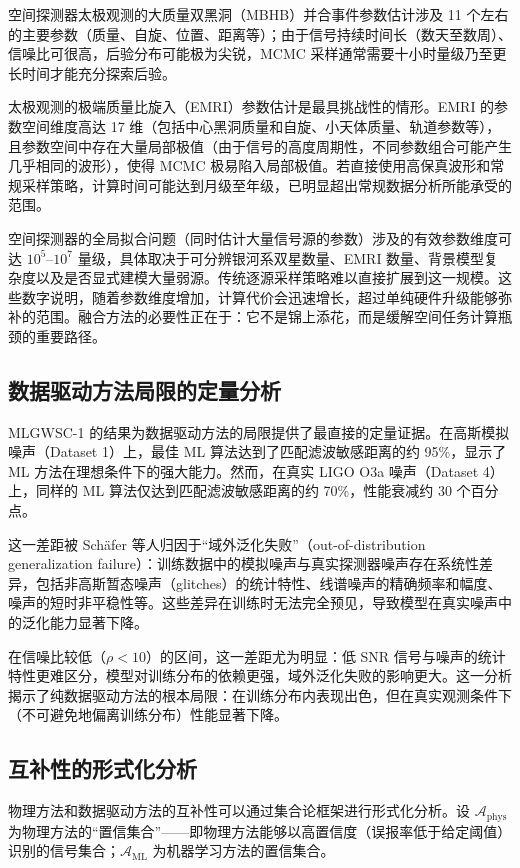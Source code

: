 空间探测器太极观测的大质量双黑洞（MBHB）并合事件参数估计涉及 11 个左右的主要参数（质量、自旋、位置、距离等）；由于信号持续时间长（数天至数周）、信噪比可很高，后验分布可能极为尖锐，MCMC 采样通常需要十小时量级乃至更长时间才能充分探索后验。

太极观测的极端质量比旋入（EMRI）参数估计是最具挑战性的情形。EMRI 的参数空间维度高达 17 维（包括中心黑洞质量和自旋、小天体质量、轨道参数等），且参数空间中存在大量局部极值（由于信号的高度周期性，不同参数组合可能产生几乎相同的波形），使得 MCMC 极易陷入局部极值。若直接使用高保真波形和常规采样策略，计算时间可能达到月级至年级，已明显超出常规数据分析所能承受的范围。

空间探测器的全局拟合问题（同时估计大量信号源的参数）涉及的有效参数维度可达 $10^5$--$10^7$ 量级，具体取决于可分辨银河系双星数量、EMRI 数量、背景模型复杂度以及是否显式建模大量弱源。传统逐源采样策略难以直接扩展到这一规模。这些数字说明，随着参数维度增加，计算代价会迅速增长，超过单纯硬件升级能够弥补的范围。融合方法的必要性正在于：它不是锦上添花，而是缓解空间任务计算瓶颈的重要路径。

\subsection{数据驱动方法局限的定量分析}

MLGWSC-1 的结果为数据驱动方法的局限提供了最直接的定量证据。在高斯模拟噪声（Dataset 1）上，最佳 ML 算法达到了匹配滤波敏感距离的约 95\%，显示了 ML 方法在理想条件下的强大能力。然而，在真实 LIGO O3a 噪声（Dataset 4）上，同样的 ML 算法仅达到匹配滤波敏感距离的约 70\%，性能衰减约 30 个百分点。

这一差距被 Schäfer 等人归因于“域外泛化失败”（out-of-distribution generalization failure）：训练数据中的模拟噪声与真实探测器噪声存在系统性差异，包括非高斯暂态噪声（glitches）的统计特性、线谱噪声的精确频率和幅度、噪声的短时非平稳性等。这些差异在训练时无法完全预见，导致模型在真实噪声中的泛化能力显著下降。

在信噪比较低（$\rho < 10$）的区间，这一差距尤为明显：低 SNR 信号与噪声的统计特性更难区分，模型对训练分布的依赖更强，域外泛化失败的影响更大。这一分析揭示了纯数据驱动方法的根本局限：在训练分布内表现出色，但在真实观测条件下（不可避免地偏离训练分布）性能显著下降。

\subsection{互补性的形式化分析}

物理方法和数据驱动方法的互补性可以通过集合论框架进行形式化分析。设 $\mathcal{A}_{\text{phys}}$ 为物理方法的“置信集合”——即物理方法能够以高置信度（误报率低于给定阈值）识别的信号集合；$\mathcal{A}_{\text{ML}}$ 为机器学习方法的置信集合。

